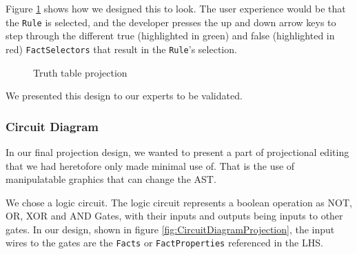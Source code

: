 Figure \ref{fig:TruthTableProjection} shows how we designed this to look.
The user experience would be that the \texttt{Rule} is selected, and the developer presses the up and down arrow keys to step through the different true (highlighted in green) and false (highlighted in red) \texttt{FactSelectors} that result in the \texttt{Rule}'s selection.

\begin{figure}[h]
    \centering
    \caption{Truth table projection}
    \label{fig:TruthTableProjection}
\end{figure}

We presented this design to our experts to be validated.

\subsubsection{Circuit Diagram}
In our final projection design, we wanted to present a part of projectional editing that we had heretofore only made minimal use of.
That is the use of manipulatable graphics that can change the AST.

We chose a logic circuit. 
The logic circuit represents a boolean operation as NOT, OR, XOR and AND Gates, with their inputs and outputs being inputs to other gates.
In our design, shown in figure \ref{fig:CircuitDiagramProjection}, the input wires to the gates are the \texttt{Facts} or \texttt{FactProperties} referenced in the LHS.

